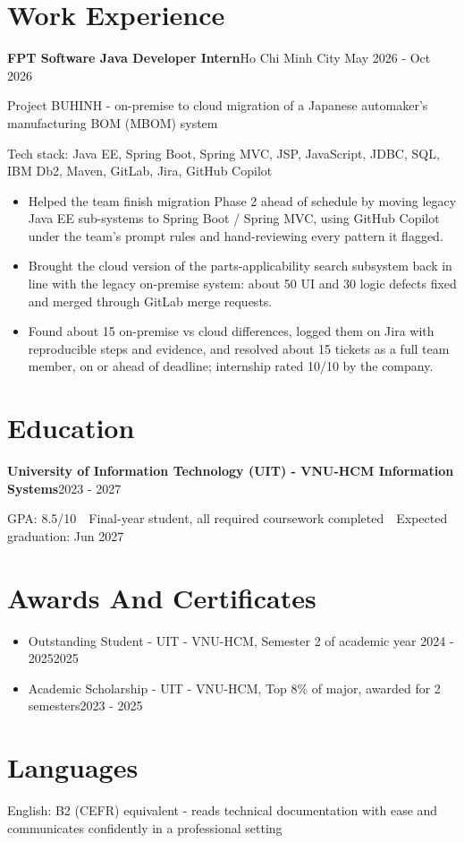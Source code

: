 \documentclass[10pt, a4paper]{article}
\newcommand{\entry}[2]{\textbf{#1}\hfill#2\par}
\newcommand{\subentry}[2]{{\color{MutedText}#1}\hfill{\color{MutedText}#2}\par}
\newcommand{\techstack}[1]{{\color{MutedText}Tech stack: #1}\par}
\newcommand{\award}[3]{\item #1 {\color{MutedText}- #2}\hfill{\color{MutedText}#3}}
\begin{document}
\section{Work Experience}
\entry{FPT Software \textbar{} Java Developer Intern}{Ho Chi Minh City \textbar{} May 2026 - Oct 2026}
\subentry{Project BUHINH - on-premise to cloud migration of a Japanese automaker's manufacturing BOM (MBOM) system}{}
\techstack{Java EE, Spring Boot, Spring MVC, JSP, JavaScript, JDBC, SQL, IBM Db2, Maven, GitLab, Jira, GitHub Copilot}
\begin{itemize}
  \item Helped the team finish migration Phase 2 ahead of schedule by moving legacy Java EE sub-systems to Spring Boot / Spring MVC, using GitHub Copilot under the team's prompt rules and hand-reviewing every pattern it flagged.
  \item Brought the cloud version of the parts-applicability search subsystem back in line with the legacy on-premise system: about 50 UI and 30 logic defects fixed and merged through GitLab merge requests.
  \item Found about 15 on-premise vs cloud differences, logged them on Jira with reproducible steps and evidence, and resolved about 15 tickets as a full team member, on or ahead of deadline; internship rated 10/10 by the company.
\end{itemize}

\section{Education}
\entry{University of Information Technology (UIT) - VNU-HCM \textbar{} Information Systems}{2023 - 2027}
GPA: 8.5/10 \,\textbar\, Final-year student, all required coursework completed \,\textbar\, Expected graduation: Jun 2027\par

\section{Awards And Certificates}
\begin{itemize}
  \award{Outstanding Student}{UIT - VNU-HCM, Semester 2 of academic year 2024 - 2025}{2025}
  \award{Academic Scholarship}{UIT - VNU-HCM, Top 8\% of major, awarded for 2 semesters}{2023 - 2025}
\end{itemize}

\section{Languages}
English: B2 (CEFR) equivalent - reads technical documentation with ease and communicates confidently in a professional setting\par
\end{document}
